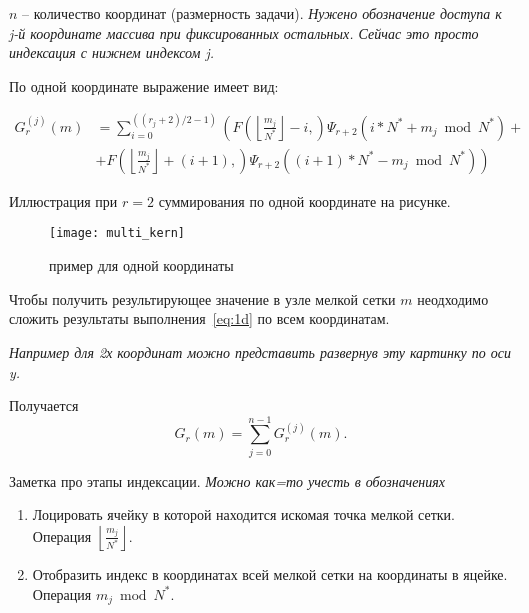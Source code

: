 $n$ -- количество координат (размерность задачи).
\emph{Нужено обозначение доступа к j-й координате массива при фиксированных остальных.
Сейчас это просто индексация с нижнем индексом j.}

По одной координате выражение имеет вид:

\begin{equation}
  \label{eq:1d}
  \begin{split}
    G^{(j)}_r(m) &= 
    \sum_{i = 0}^{((r_j+2)/2 -1)}
    \left(
    F \left( \left \lfloor \frac{m_j}{N^*} \right \rfloor - i,
    \right)
    \Psi_{r+2}(i*N^* + m_j\bmod N^*) +{} \right.\\
    & \left. + F \left(
    \left \lfloor \frac{m_j}{N^*} \right \rfloor + (i+1),
    \right)
    \Psi_{r+2}((i+1)*N^* - m_j \bmod N^*)
  \right)
  \end{split}
\end{equation}

Иллюстрация при $r=2$ суммирования по одной координате на рисунке.
\begin{figure}[h!]
  \centering
  \texttt{[image: multi\_kern]} 
  \caption{пример для одной координаты}
  \label{fig:reg_net}
\end{figure}
\FloatBarrier

Чтобы получить результирующее значение в узле мелкой сетки $m$
неодходимо сложить результаты выполнения~\eqref{eq:1d} по всем координатам.

\emph {Например для 2х координат можно представить развернув эту картинку по оси y.}

Получается
\begin{equation}
  G_r(m) = \sum_{j=0}^{n-1}G^{(j)}_r(m).
\end{equation}


Заметка про этапы индексации.
\emph{Можно как=то учесть в обозначениях}
\begin{enumerate}
\item
  Лоцировать ячейку в которой находится искомая точка мелкой сетки.
  Операция $\left \lfloor \frac{m_j}{N^*} \right \rfloor$.

\item
  Отобразить индекс в координатах всей мелкой сетки на координаты в яцейке.
  Операция $m_j \bmod N^*$.
\end{enumerate}
  
